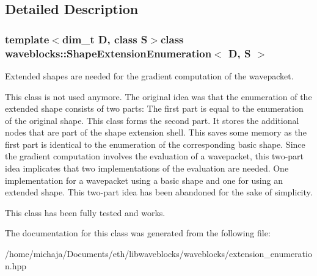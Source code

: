 \subsection{Detailed Description}
\subsubsection*{template$<$dim\+\_\+t D, class S$>$class waveblocks\+::\+Shape\+Extension\+Enumeration$<$ D, S $>$}

Extended shapes are needed for the gradient computation of the wavepacket.

This class is not used anymore. The original idea was that the enumeration of the extended shape consists of two parts\+: The first part is equal to the enumeration of the original shape. This class forms the second part. It stores the additional nodes that are part of the shape extension \textquotesingle{}shell\textquotesingle{}. This saves some memory as the first part is identical to the enumeration of the corresponding basic shape. Since the gradient computation involves the evaluation of a wavepacket, this two-\/part idea implicates that two implementations of the evaluation are needed. One implementation for a wavepacket using a basic shape and one for using an extended shape. This two-\/part idea has been abandoned for the sake of simplicity.

This class has been fully tested and works. 

The documentation for this class was generated from the following file\+:\begin{DoxyCompactItemize}
\item 
/home/michaja/\+Documents/eth/libwaveblocks/waveblocks/extension\+\_\+enumeration.\+hpp\end{DoxyCompactItemize}
